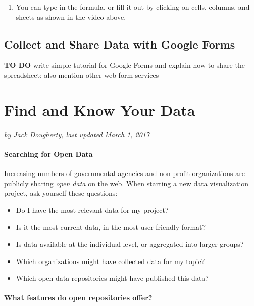 \documentclass[
  english,
]{book}
\providecommand{\tightlist}{%
  \setlength{\itemsep}{0pt}\setlength{\parskip}{0pt}}
\begin{document}
\begin{enumerate}
\def\labelenumi{\arabic{enumi})}
\setcounter{enumi}{3}
\tightlist
\item
  You can type in the formula, or fill it out by clicking on cells, columns, and sheets as shown in the video above.
\end{enumerate}

\hypertarget{forms}{%
\section{Collect and Share Data with Google Forms}\label{forms}}

\textbf{TO DO } write simple tutorial for Google Forms and explain how to share the spreadsheet; also mention other web form services

\hypertarget{find}{%
\chapter{Find and Know Your Data}\label{find}}

\emph{by \href{authors}{Jack Dougherty}, last updated March 1, 2017}

\hypertarget{searching-for-open-data}{%
\subsubsection*{Searching for Open Data}\label{searching-for-open-data}}

Increasing numbers of governmental agencies and non-profit organizations are publicly sharing \emph{open data} on the web. When starting a new data visualization project, ask yourself these questions:

\begin{itemize}
\tightlist
\item
  Do I have the most relevant data for my project?
\item
  Is it the most current data, in the most user-friendly format?
\item
  Is data available at the individual level, or aggregated into larger groups?
\item
  Which organizations might have collected data for my topic?
\item
  Which open data repositories might have published this data?
\end{itemize}

\hypertarget{what-features-do-open-repositories-offer}{%
\subsubsection{What features do open repositories offer?}\label{what-features-do-open-repositories-offer}}
\end{document}
